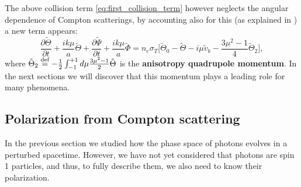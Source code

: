The above collision term \eqref{eq:first_collision_term} however neglects the angular dependence of Compton scatterings, by accounting also for this (as explained in \cite{dodelson}) a new term appears:
\begin{equation}
    \frac{\partial \tilde\Theta}{\partial t} +\frac{ik\mu}{a}\tilde\Theta+\frac{\partial \tilde\Psi}{\partial t}+\frac{ik\mu}{a}\tilde\Phi=n_e \sigma_T\Bigg[\tilde\Theta_0-\tilde\Theta-i\mu\tilde v_b-\frac{3\mu^2-1}{4}\tilde\Theta_2\Bigg],
\end{equation}
where $\tilde\Theta_2\stackrel{\text{def}}{=} -\frac{1}{2}\int_{-1}^{+1}d\mu\frac{3\mu^2-1}{2}\tilde\Theta$ is the \textbf{anisotropy quadrupole momentum}. In the next sections we will discover that this momentum plays a leading role for many phenomena.
\subsection{Polarization from Compton scattering}\label{sec:ComptonPolarization}
In the previous section we studied how the phase space of photons evolves in a perturbed spacetime. However, we have not yet considered that photons are spin 1 particles, and thus, to fully describe them, we also need to know their polarization.

